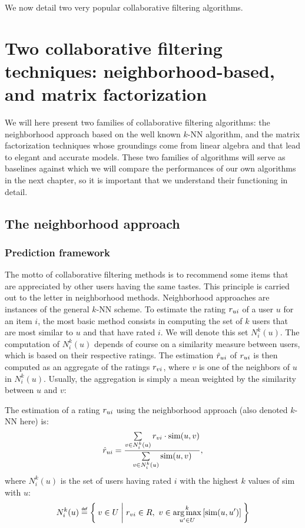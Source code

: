We now detail two very popular collaborative filtering algorithms.

\section{Two collaborative filtering techniques: neighborhood-based, and matrix
factorization}
\label{SEC:neighborhood_and_matrix_facto_review}

We will here present two families of collaborative filtering algorithms: the
neighborhood approach based on the well known $k$-NN algorithm, and the matrix
factorization techniques whose groundings come from linear algebra and that
lead to elegant and accurate models. These two families of algorithms will
serve as baselines against which we will compare the performances of our own
algorithms in the next chapter, so it is important that we understand their
functioning in detail.

\subsection{The neighborhood approach}
\label{SEC:neighborhood_approach}

\subsubsection{Prediction framework}

The motto of collaborative filtering methods is to recommend some items that
are appreciated by other users having the same tastes. This principle is
carried out to the letter in neighborhood methods. Neighborhood approaches are instances of the general $k$-NN scheme. To estimate
the rating $r_{ui}$ of a user $u$ for an item $i$, the most basic method consists
in computing  the set of $k$ users that are most similar to $u$ and
that have rated $i$. We will denote this set $N_i^k(u)$. The computation of
$N_i^k(u)$ depends of course on a similarity measure between users, which is
based on their respective ratings. The estimation $\hat{r}_{ui}$ of $r_{ui}$ is then
computed as an aggregate of the ratings $r_{vi}$, where $v$ is one of the
neighbors of $u$ in $N_i^k(u)$. Usually, the aggregation is simply a mean
weighted by the similarity between $u$ and $v$:

\begin{definition}
  The estimation of a rating $r_{ui}$ using the neighborhood approach (also
  denoted $k$-NN here) is:
  $$\hat{r}_{ui} = \frac{\sum\limits_{v \in N_i^k(u)} r_{vi} \cdot \text{sim}(u, v)}
  {\sum\limits_{v \in N_i^k(u)}\text{sim}(u, v)},$$
  where $N_i^k(u)$ is the set of users having rated $i$ with the highest $k$
  values of sim with $u$:
  $$N_i^k(u) \eqdef \Set{v \in U | \rvi \in R,~v\in \argmax_{u' \in
  U}^k\left[\text{sim}(u, u')\right]}$$
\end{definition}

